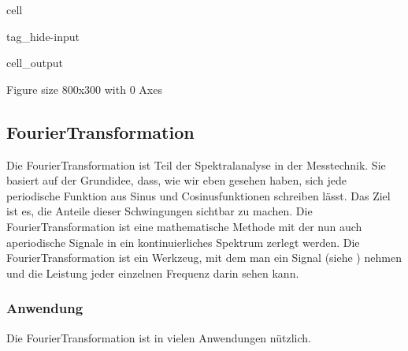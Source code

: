 \documentclass[letterpaper,10pt,english]{jupyterBook}
\begin{document}
\begin{sphinxuseclass}{cell}
\begin{sphinxuseclass}{tag_hide-input}\begin{sphinxVerbatimOutput}

\begin{sphinxuseclass}{cell_output}
\begin{sphinxVerbatim}[commandchars=\\\{\}]
\PYGZlt{}Figure size 800x300 with 0 Axes\PYGZgt{}
\end{sphinxVerbatim}

\noindent{}

\end{sphinxuseclass}\end{sphinxVerbatimOutput}

\end{sphinxuseclass}
\end{sphinxuseclass}

\subsection{Fourier\sphinxhyphen{}Transformation}
\label{\detokenize{content/3_FourierAnalyse:fourier-transformation}}
\sphinxAtStartPar


\sphinxAtStartPar
Die Fourier\sphinxhyphen{}Transformation ist Teil der Spektralanalyse in der Messtechnik. Sie basiert auf der Grundidee, dass, wie wir eben gesehen haben, sich jede periodische Funktion aus Sinus\sphinxhyphen{} und Cosinusfunktionen schreiben lässt. Das Ziel ist es, die Anteile dieser Schwingungen sichtbar zu machen. Die Fourier\sphinxhyphen{}Transformation ist eine mathematische Methode mit der nun auch aperiodische Signale in ein kontinuierliches Spektrum zerlegt werden. Die Fourier\sphinxhyphen{}Transformation ist ein Werkzeug, mit dem man ein Signal (siehe {\hyperref[\detokenize{content/3_Messsignale::doc}]{}}) nehmen und die Leistung jeder einzelnen Frequenz darin sehen kann.


\subsubsection{Anwendung}
\label{\detokenize{content/3_FourierAnalyse:anwendung}}
\sphinxAtStartPar


\sphinxAtStartPar
Die Fourier\sphinxhyphen{}Transformation ist in vielen Anwendungen nützlich.
\end{document}
